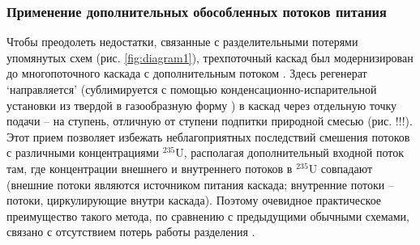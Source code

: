 \subsubsection{Применение дополнительных обособленных потоков питания}
Чтобы преодолеть недостатки, связанные с разделительными потерями упомянутых схем (рис. \ref{fig:diagram1}), трехпоточный каскад был модернизирован до многопоточного каскада с дополнительным потоком \cite{smirnovKaskadnyeShemyZadachah2012}. Здесь регенерат `направляется' (сублимируется с помощью конденсационно-испарительной установки из твердой в газообразную форму \cite{orlovDesublimationPurificationTransporting2017}) в каскад через отдельную точку подачи -- на ступень, отличную от ступени подпитки природной смесью (рис. !!!). Этот прием позволяет избежать неблагоприятных последствий смешения потоков с различными концентрациями $^{235}$U, располагая дополнительный входной поток там, где концентрации внешнего и внутреннего потоков в $^{235}$U совпадают (внешние потоки являются источником питания каскада; внутренние потоки -- потоки, циркулирующие внутри каскада). Поэтому очевидное практическое преимущество такого метода, по сравнению с предыдущими обычными схемами, связано с отсутствием потерь работы разделения \cite{smirnovKaskadnyeShemyZadachah2012, sulaberidzeQuasiidealCascadesAdditional2006}.

